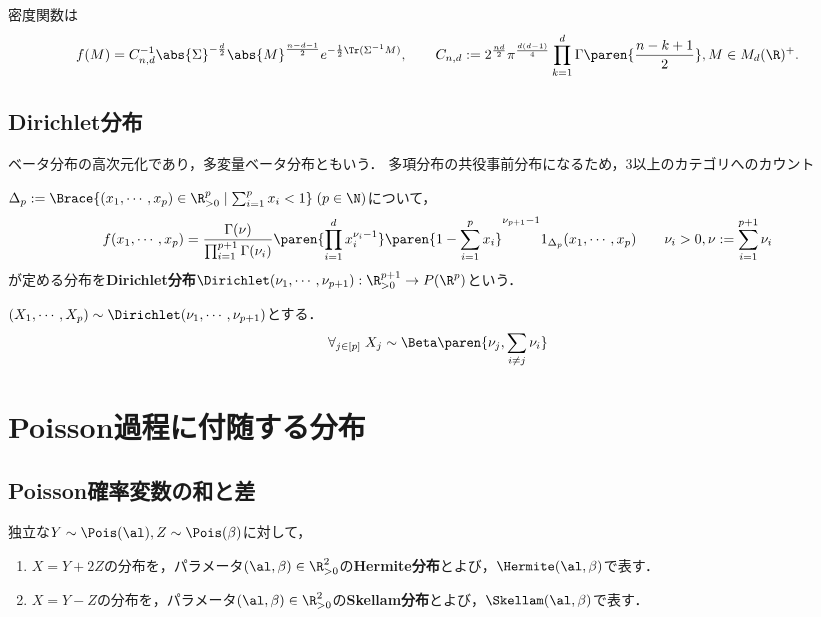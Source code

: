 \documentclass[uplatex,dvipdfmx]{jsreport}
\begin{document}
\begin{proposition}
    密度関数は
    \[f(M)=C_{n,d}^{-1}\abs{\Sigma}^{-\frac{d}{2}}\abs{M}^{\frac{n-d-1}{2}}e^{-\frac{1}{2}\Tr(\Sigma^{-1}M)},\qquad C_{n,d}:=2^{\frac{nd}{2}}\pi^{\frac{d(d-1)}{4}}\prod^d_{k=1}\Gamma\paren{\frac{n-k+1}{2}},M\in M_d(\R)^+.\]
\end{proposition}

\subsection{Dirichlet分布}

\begin{tcolorbox}[colframe=ForestGreen, colback=ForestGreen!10!white,breakable,colbacktitle=ForestGreen!40!white,coltitle=black,fonttitle=\bfseries\sffamily,
title=]
    ベータ分布の高次元化であり，多変量ベータ分布ともいう．
    多項分布の共役事前分布になるため，3以上のカテゴリへのカウント
\end{tcolorbox}

\begin{definition}
    $\Delta_p:=\Brace{(x_1,\cdots,x_p)\in\R_{>0}^p\mid\sum^p_{i=1}x_i<1}\;(p\in\N)$について，
    \[f(x_1,\cdots,x_p)=\frac{\Gamma(\nu)}{\prod^{p+1}_{i=1}\Gamma(\nu_i)}\paren{\prod^d_{i=1}x_i^{\nu_i-1}}\paren{1-\sum^p_{i=1}x_i}^{\nu_{p+1}-1}1_{\Delta_p}(x_1,\cdots,x_p)\qquad\nu_i>0,\nu:=\sum^{p+1}_{i=1}\nu_i\]
    が定める分布を\textbf{Dirichlet分布}$\Dirichlet(\nu_1,\cdots,\nu_{p+1}):\R_{>0}^{p+1}\to P(\R^p)$という．
\end{definition}

\begin{proposition}[周辺分布はBeta分布である]
    $(X_1,\cdots,X_p)\sim\Dirichlet(\nu_1,\cdots,\nu_{p+1})$とする．
    \[\forall_{j\in[p]}\;X_j\sim\Beta\paren{\nu_j,\sum_{i\ne j}\nu_i}\]
\end{proposition}

\section{Poisson過程に付随する分布}

\subsection{Poisson確率変数の和と差}

\begin{definition}\label{def-Hermite-and-Skellam}
    独立な$Y\sim\Pois(\al),Z\sim\Pois(\beta)$に対して，
    \begin{enumerate}
        \item $X=Y+2Z$の分布を，パラメータ$(\al,\beta)\in\R_{>0}^2$の\textbf{Hermite分布}とよび，$\Hermite(\al,\beta)$で表す．
        \item $X=Y-Z$の分布を，パラメータ$(\al,\beta)\in\R_{>0}^2$の\textbf{Skellam分布}とよび，$\Skellam(\al,\beta)$で表す．
    \end{enumerate}
\end{definition}
\end{document}
